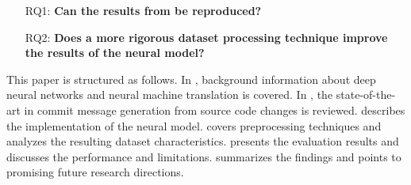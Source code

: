 \begin{itemize}
    \item[RQ1:] \textbf{Can the results from \citet{jiang_automatically_2017} be reproduced?}
    \item[RQ2:] \textbf{Does a more rigorous dataset processing technique improve the results of the neural model?}
\end{itemize}

This paper is structured as follows. In , background information about deep neural networks and neural machine translation is covered. In , the state-of-the-art in commit message generation from source code changes is reviewed.  describes the implementation of the neural model.  covers preprocessing techniques and analyzes the resulting dataset characteristics.  presents the evaluation results and  discusses the performance and limitations.  summarizes the findings and points to promising future research directions.
